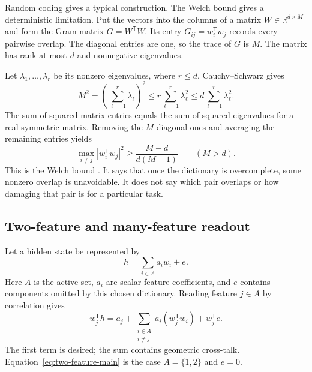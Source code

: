 \documentclass[
  aps,
  reprint,
  superscriptaddress,
  floatfix,
  nofootinbib,
  longbibliography
]{revtex4-2}
\newcommand{\R}{\mathbb{R}}
\newcommand{\T}{^{\mathsf T}}
\begin{document}
Random coding gives a typical construction.  The Welch bound gives a
deterministic limitation.  Put the vectors into the columns of a matrix
$W\in\R^{d\times M}$ and form the Gram matrix $G=W\T W$.  Its entry
$G_{ij}=w_i\T w_j$ records every pairwise overlap.  The diagonal entries are
one, so the trace of $G$ is $M$.  The matrix has rank at most $d$ and
nonnegative eigenvalues.

Let $\lambda_1,\ldots,\lambda_r$ be its nonzero eigenvalues, where $r\leq d$.
Cauchy--Schwarz gives
\begin{equation}
 M^2=\left(\sum_{\ell=1}^r\lambda_\ell\right)^2
 \leq r\sum_{\ell=1}^r\lambda_\ell^2
 \leq d\sum_{\ell=1}^r\lambda_\ell^2.
 \label{eq:eigen-cs-app}
\end{equation}
The sum of squared matrix entries equals the sum of squared eigenvalues for a
real symmetric matrix.  Removing the $M$ diagonal ones and averaging the
remaining entries yields
\begin{equation}
 \max_{i\ne j}|w_i\T w_j|^2
 \geq \frac{M-d}{d(M-1)}
 \qquad (M>d).
 \label{eq:welch-app}
\end{equation}
This is the Welch bound \cite{welch1974coherence}.  It says that once the
dictionary is overcomplete, some nonzero overlap is unavoidable.  It does not
say which pair overlaps or how damaging that pair is for a particular task.

\subsection{Two-feature and many-feature readout}

Let a hidden state be represented by
\begin{equation}
 h=\sum_{i\in A}a_iw_i+e.
 \label{eq:feature-code-app}
\end{equation}
Here $A$ is the active set, $a_i$ are scalar feature coefficients, and $e$ contains
components omitted by this chosen dictionary.  Reading feature $j\in A$ by
correlation gives
\begin{equation}
 w_j\T h
 =a_j+\sum_{\substack{i\in A\\i\ne j}}
 a_i(w_j\T w_i)+w_j\T e.
 \label{eq:readout-app}
\end{equation}
The first term is desired; the sum contains geometric cross-talk.
Equation~\eqref{eq:two-feature-main} is the case $A=\{1,2\}$ and $e=0$.
\end{document}
